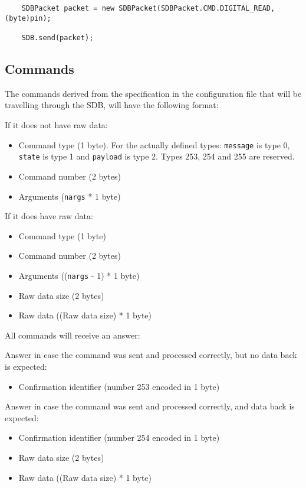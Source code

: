 \documentclass[12pt,a4paper]{report}
\begin{document}
\begin{lstlisting}
    SDBPacket packet = new SDBPacket(SDBPacket.CMD.DIGITAL_READ,(byte)pin);
    
    SDB.send(packet);
\end{lstlisting}


\subsection*{Commands}
The commands derived from the specification in the configuration file that will be travelling through the SDB, will have the following format:

If it does not have raw data:
\begin{itemize}
\item Command type (1 byte). For the actually defined types: \texttt{message} is type 0, \texttt{state} is type 1 and \texttt{payload} is type 2. Types 253, 254 and 255 are reserved.
\item Command number (2 bytes)
\item Arguments (\texttt{nargs} * 1 byte)
\end{itemize}

If it does have raw data:
\begin{itemize}
\item Command type (1 byte)
\item Command number (2 bytes)
\item Arguments ((\texttt{nargs} - 1) * 1 byte)
\item Raw data size (2 bytes)
\item Raw data ((Raw data size) * 1 byte)
\end{itemize}

All commands will receive an answer:

Answer in case the command was sent and processed correctly, but no data back is expected:
\begin{itemize}
\item Confirmation identifier (number 253 encoded in 1 byte)
\end{itemize}

Answer in case the command was sent and processed correctly, and data back is expected:
\begin{itemize}
\item Confirmation identifier (number 254 encoded in 1 byte)
\item Raw data size (2 bytes)
\item Raw data ((Raw data size) * 1 byte)
\end{itemize}
\end{document}
